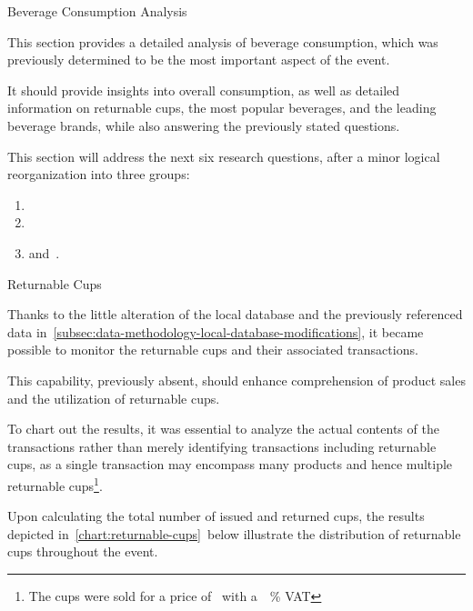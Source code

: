 \begin{section}{Beverage Consumption Analysis}
	\label{sec:analysis-beverage-consumption}

	This section provides a detailed analysis of beverage consumption, which was previously determined to be the most important aspect of the event.

	It should provide insights into overall consumption, as well as detailed information on returnable cups, the most popular beverages, and the leading beverage brands, while also answering the previously stated questions.

	This section will address the next six research questions, after a minor logical reorganization into three groups:
	\begin{enumerate}
		\item {}
		\item {}
		\item and~.
	\end{enumerate}

	\begin{subsection}{Returnable Cups}
		\label{subsec:analysis-beverage-returnable-cups}

		Thanks to the little alteration of the local database and the previously referenced data in~\autoref{subsec:data-methodology-local-database-modifications}, it became possible to monitor the returnable cups and their associated transactions.

		This capability, previously absent, should enhance comprehension of product sales and the utilization of returnable cups.


		To chart out the results, it was essential to analyze the actual contents of the transactions rather than merely identifying transactions including returnable cups,
		as a single transaction may encompass many products and hence multiple returnable cups\footnote{The cups were sold for a price of~ with a~~\% VAT}.

		Upon calculating the total number of issued and returned cups, the results depicted in~\autoref{chart:returnable-cups}~below illustrate the distribution of returnable cups throughout the event.


\end{subsection}
\end{section}
